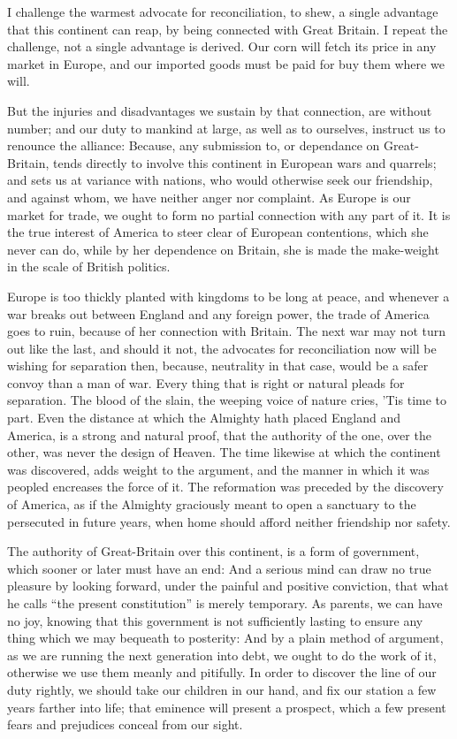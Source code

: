 \documentclass[12pt,oneside]{memoir}
\begin{document}
I challenge the warmest advocate for reconciliation, to shew, a
single advantage that this continent can reap, by being connected
with Great Britain. I repeat the challenge, not a single advantage
is derived. Our corn will fetch its price in any market in Europe,
and our imported goods must be paid for buy them where we will.

But the injuries and disadvantages we sustain by that connection,
are without number; and our duty to mankind at large, as well as to
ourselves, instruct us to renounce the alliance: Because, any
submission to, or dependance on Great-Britain, tends directly to
involve this continent in European wars and quarrels; and sets us at
variance with nations, who would otherwise seek our friendship, and
against whom, we have neither anger nor complaint. As Europe is our
market for trade, we ought to form no partial connection with any
part of it. It is the true interest of America to steer clear of
European contentions, which she never can do, while by her
dependence on Britain, she is made the make-weight in the scale of
British politics.

Europe is too thickly planted with kingdoms to be long at peace, and
whenever a war breaks out between England and any foreign power, the
trade of America goes to ruin, because of her connection with
Britain. The next war may not turn out like the last, and should it
not, the advocates for reconciliation now will be wishing for
separation then, because, neutrality in that case, would be a safer
convoy than a man of war. Every thing that is right or natural
pleads for separation. The blood of the slain, the weeping voice of
nature cries, 'Tis time to part. Even the distance at which the
Almighty hath placed England and America, is a strong and natural
proof, that the authority of the one, over the other, was never the
design of Heaven. The time likewise at which the continent was
discovered, adds weight to the argument, and the manner in which it
was peopled encreases the force of it. The reformation was preceded
by the discovery of America, as if the Almighty graciously meant to
open a sanctuary to the persecuted in future years, when home should
afford neither friendship nor safety.

The authority of Great-Britain over this continent, is a form of
government, which sooner or later must have an end: And a serious
mind can draw no true pleasure by looking forward, under the painful
and positive conviction, that what he calls ``the present
constitution'' is merely temporary. As parents, we can have no joy,
knowing that this government is not sufficiently lasting to ensure
any thing which we may bequeath to posterity: And by a plain method
of argument, as we are running the next generation into debt, we
ought to do the work of it, otherwise we use them meanly and
pitifully. In order to discover the line of our duty rightly, we
should take our children in our hand, and fix our station a few
years farther into life; that eminence will present a prospect,
which a few present fears and prejudices conceal from our sight.
\end{document}
